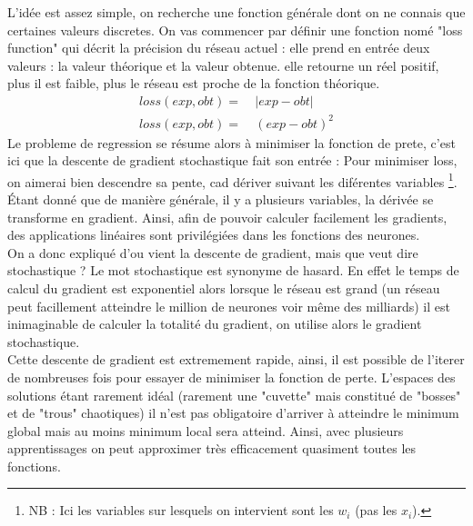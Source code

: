 L'idée est assez simple, on recherche une fonction générale dont on ne connais que certaines valeurs discretes.
On vas commencer par définir une fonction nomé "loss function"
qui décrit la précision du réseau actuel :
elle prend en entrée deux valeurs : la valeur théorique et la valeur obtenue.
elle retourne un réel positif, plus il est faible, plus le réseau est proche de la fonction théorique.
\exemle
{
\begin{align*}
    loss(exp, obt) = &\ |exp - obt| \\
    loss(exp, obt) = &\ (exp - obt)^2
\end{align*}
}
Le probleme de regression se résume alors à minimiser la fonction de prete,
c'est ici que la descente de gradient stochastique fait son entrée :
Pour minimiser loss, on aimerai bien descendre sa pente, cad dériver suivant les diférentes variables
\footnote{\textsc{NB :} Ici les variables sur lesquels on intervient sont les $w_i$ (pas les $x_i$).}.
Étant donné que de manière générale, il y a plusieurs variables, la dérivée se transforme en gradient.
Ainsi, afin de pouvoir calculer facilement les gradients,
des applications linéaires sont privilégiées dans les fonctions des neurones.\\


On a donc expliqué d'ou vient la descente de gradient, mais que veut dire stochastique ?
Le mot stochastique est synonyme de hasard.
En effet le temps de calcul du gradient est exponentiel
alors lorsque le réseau est grand
(un réseau peut facillement atteindre le million de neurones voir même des milliards\cite{i3espectrum})
il est inimaginable de calculer la totalité du gradient, on utilise alors le gradient stochastique.\\


Cette descente de gradient est extremement rapide, ainsi, il est possible de l'iterer de nombreuses fois
pour essayer de minimiser la fonction de perte.
L'espaces des solutions étant rarement idéal
(rarement une "cuvette" mais constitué de "bosses" et de "trous" chaotiques)
il n'est pas obligatoire d'arriver à atteindre le minimum global mais au moins minimum local sera atteind.
Ainsi, avec plusieurs apprentissages on peut approximer très efficacement quasiment toutes les fonctions.
